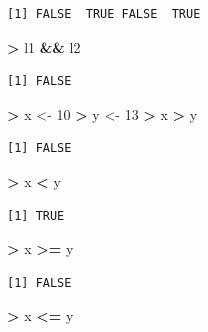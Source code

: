 \documentclass[11pt,a4paper]{book}
\newenvironment{Shaded}{\begin{snugshade}}{\end{snugshade}}
\newcommand{\DecValTok}[1]{\textcolor[rgb]{0.00,0.00,0.81}{#1}}
\newcommand{\StringTok}[1]{\textcolor[rgb]{0.31,0.60,0.02}{#1}}
\newcommand{\OperatorTok}[1]{\textcolor[rgb]{0.81,0.36,0.00}{\textbf{#1}}}
\newcommand{\NormalTok}[1]{#1}
\theoremstyle{definition}
\theoremstyle{definition}
\theoremstyle{definition}
\theoremstyle{remark}
\begin{document}
\begin{verbatim}
[1] FALSE  TRUE FALSE  TRUE
\end{verbatim}

\begin{Shaded}
\begin{Highlighting}[]
\OperatorTok{>}\StringTok{ }\NormalTok{l1 }\OperatorTok{&&}\StringTok{ }\NormalTok{l2}
\end{Highlighting}
\end{Shaded}

\begin{verbatim}
[1] FALSE
\end{verbatim}

\begin{Shaded}
\begin{Highlighting}[]
\OperatorTok{>}\StringTok{ }\NormalTok{x <-}\StringTok{ }\DecValTok{10}
\OperatorTok{>}\StringTok{ }\NormalTok{y <-}\StringTok{ }\DecValTok{13}
\OperatorTok{>}\StringTok{ }\NormalTok{x }\OperatorTok{>}\StringTok{ }\NormalTok{y}
\end{Highlighting}
\end{Shaded}

\begin{verbatim}
[1] FALSE
\end{verbatim}

\begin{Shaded}
\begin{Highlighting}[]
\OperatorTok{>}\StringTok{ }\NormalTok{x }\OperatorTok{<}\StringTok{ }\NormalTok{y}
\end{Highlighting}
\end{Shaded}

\begin{verbatim}
[1] TRUE
\end{verbatim}

\begin{Shaded}
\begin{Highlighting}[]
\OperatorTok{>}\StringTok{ }\NormalTok{x }\OperatorTok{>=}\StringTok{ }\NormalTok{y}
\end{Highlighting}
\end{Shaded}

\begin{verbatim}
[1] FALSE
\end{verbatim}

\begin{Shaded}
\begin{Highlighting}[]
\OperatorTok{>}\StringTok{ }\NormalTok{x }\OperatorTok{<=}\StringTok{ }\NormalTok{y}
\end{Highlighting}
\end{Shaded}
\end{document}
